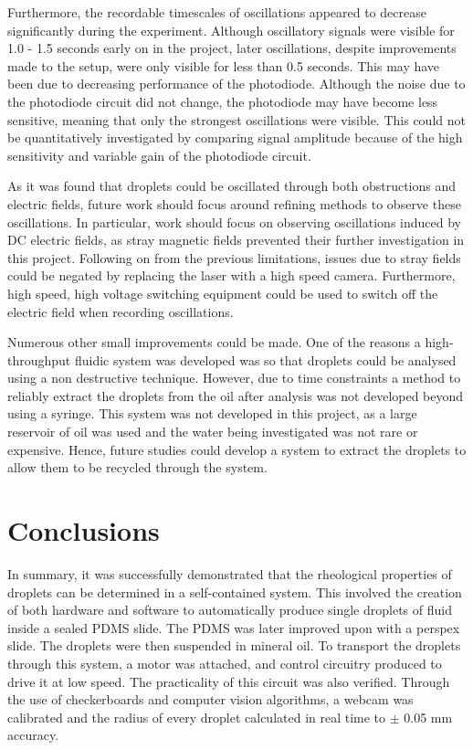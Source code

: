 \documentclass{physics_article_B}
\begin{document}
    Furthermore, the recordable timescales of oscillations appeared to decrease significantly during the experiment. Although oscillatory signals were visible for 1.0 - 1.5 seconds early on in the project, later oscillations, despite improvements made to the setup, were only visible for less than 0.5 seconds. This may have been due to decreasing performance of the photodiode. Although the noise due to the photodiode circuit did not change, the photodiode may have become less sensitive, meaning that only the strongest oscillations were visible. This could not be quantitatively investigated by comparing signal amplitude because of the high sensitivity and variable gain of the photodiode circuit. 
    
    As it was found that droplets could be oscillated through both obstructions and electric fields, future work should focus around refining methods to observe these oscillations. In particular, work should focus on observing oscillations induced by DC electric fields, as stray magnetic fields prevented their further investigation in this project. Following on from the previous limitations, issues due to stray fields could be negated by replacing the laser with a high speed camera. Furthermore, high speed, high voltage switching equipment could be used to switch off the electric field when recording oscillations. 
    
    Numerous other small improvements could be made. One of the reasons a high-throughput fluidic system was developed was so that droplets could be analysed using a non destructive technique. However, due to time constraints a method to reliably extract the droplets from the oil after analysis was not developed beyond using a syringe. This system was not developed in this project, as a large reservoir of oil was used and the water being investigated was not rare or expensive. Hence, future studies could develop a system to extract the droplets to allow them to be recycled through the system.
    
\vspace*{-0.2cm}    
\section{Conclusions\label{sect:conc}}

    In summary, it was successfully demonstrated that the rheological properties of droplets can be determined in a self-contained system. This involved the creation of both hardware and software to automatically produce single droplets of fluid inside a sealed PDMS slide. The PDMS was later improved upon with a perspex slide. The droplets were then suspended in mineral oil. To transport the droplets through this system, a motor was attached, and control circuitry produced to drive it at low speed. The practicality of this circuit was also verified. Through the use of checkerboards and computer vision algorithms, a webcam was calibrated and the radius of every droplet calculated in real time to $\pm$ 0.05 mm accuracy. 
    
\end{document}
